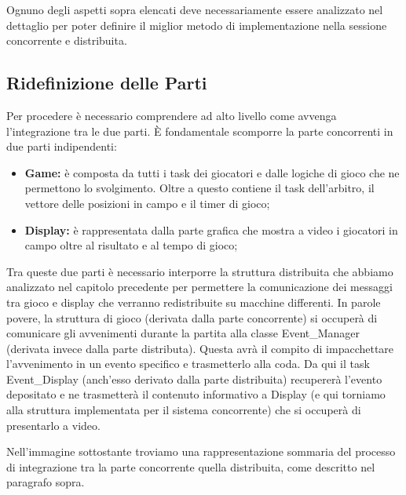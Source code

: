 \documentclass[aps,letterpaper,10pt]{article}
\begin{document}
Ognuno degli aspetti sopra elencati deve necessariamente essere analizzato nel dettaglio per poter definire il miglior metodo di implementazione nella sessione concorrente e distribuita.

\subsection{Ridefinizione delle Parti} %
\label{sub:ridefinizione_delle_parti}

Per procedere \`e necessario comprendere ad alto livello come avvenga l'integrazione tra le due parti. \`E fondamentale scomporre la parte concorrenti in due parti indipendenti:

\begin{itemize}
	\item \textbf{Game:} \`e composta da tutti i task dei giocatori e dalle logiche di gioco che ne permettono lo svolgimento. Oltre a questo contiene il task dell'arbitro, il vettore delle posizioni in campo e il timer di gioco;
	\item \textbf{Display:} \`e rappresentata dalla parte grafica che mostra a video i giocatori in campo oltre al risultato e al tempo di gioco;
\end{itemize}

Tra queste due parti \`e necessario interporre la struttura distribuita che abbiamo analizzato nel capitolo precedente per permettere la comunicazione dei messaggi tra gioco e display che verranno redistribuite su macchine differenti. In parole povere, la struttura di gioco (derivata dalla parte concorrente) si occuper\`a di comunicare gli avvenimenti durante la partita alla classe Event\_Manager (derivata invece dalla parte distributa). Questa avr\`a il compito di impacchettare l'avvenimento in un evento specifico e trasmetterlo alla coda. Da qui il task Event\_Display (anch'esso derivato dalla parte distribuita) recuperer\`a l'evento depositato e ne trasmetter\`a il contenuto informativo a Display (e qui torniamo alla struttura implementata per il sistema concorrente) che si occuper\`a di presentarlo a video. \vspace{3mm}

Nell'immagine sottostante troviamo una rappresentazione sommaria del processo di integrazione tra la parte concorrente quella distribuita, come descritto nel paragrafo sopra.
\end{document}

